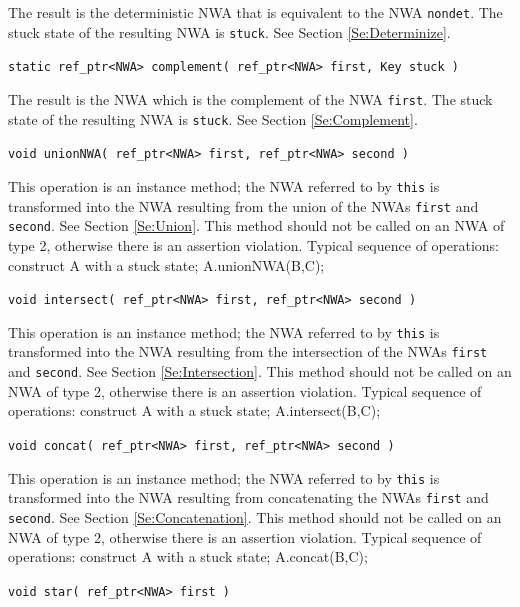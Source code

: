 \begin{description}
    The result is the deterministic NWA that is equivalent to the NWA
    \texttt{nondet}.  The stuck state of the resulting NWA is \texttt{stuck}.
    See Section \ref{Se:Determinize}.

  \item\texttt{static ref\_ptr<NWA> complement( ref\_ptr<NWA> first, Key stuck )} \nopagebreak

    The result is the NWA which is the complement of the NWA \texttt{first}.
    The stuck state of the resulting NWA is \texttt{stuck}.  See Section
    \ref{Se:Complement}.

  \item\texttt{void unionNWA( ref\_ptr<NWA> first, ref\_ptr<NWA> second )} \nopagebreak

    This operation is an instance method; the NWA referred to by
    \texttt{this} is transformed into the NWA resulting from the union of the
    NWAs \texttt{first} and \texttt{second}.  See Section \ref{Se:Union}.
    This method should not be called on an NWA of type 2, otherwise there is
    an assertion violation.  Typical sequence of operations: construct A with
    a stuck state; A.unionNWA(B,C);

 \item\texttt{void intersect( ref\_ptr<NWA> first, ref\_ptr<NWA> second )} \nopagebreak

    This operation is an instance method; the NWA referred to by
    \texttt{this} is transformed into the NWA resulting from the intersection
    of the NWAs \texttt{first} and \texttt{second}.  See Section
    \ref{Se:Intersection}.  This method should not be called on an NWA of
    type 2, otherwise there is an assertion violation.  Typical sequence of
    operations: construct A with a stuck state; A.intersect(B,C);

  \item\texttt{void concat( ref\_ptr<NWA> first, ref\_ptr<NWA> second )} \nopagebreak

    This operation is an instance method; the NWA referred to by
    \texttt{this} is transformed into the NWA resulting from concatenating
    the NWAs \texttt{first} and \texttt{second}.  See Section
    \ref{Se:Concatenation}.  This method should not be called on an NWA of
    type 2, otherwise there is an assertion violation.  Typical sequence of
    operations: construct A with a stuck state; A.concat(B,C);

  \item\texttt{void star( ref\_ptr<NWA> first )} \nopagebreak


\end{description}
